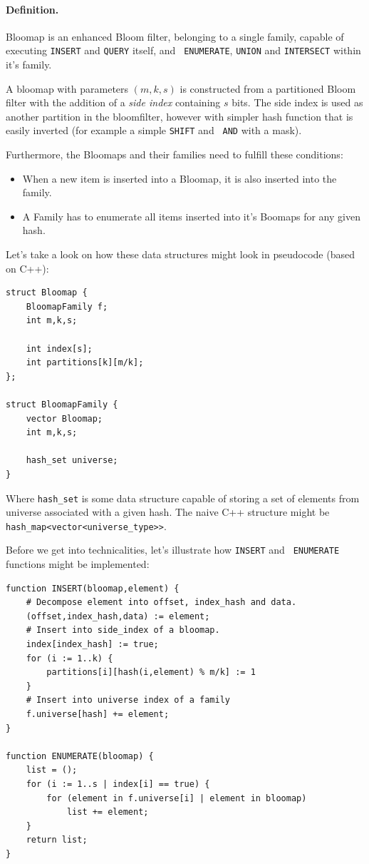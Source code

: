\paragraph{Definition.} Bloomap is an enhanced Bloom filter, belonging to a single
family, capable of executing {\tt INSERT} and {\tt QUERY} itself, and {\tt
ENUMERATE}, {\tt UNION} and {\tt INTERSECT} within it's family.

A bloomap with parameters $(m, k, s)$ is constructed from a partitioned Bloom
filter with the addition of a {\it side index} containing $s$ bits. The side
index is used as another partition in the bloomfilter, however with simpler hash
function that is easily inverted (for example a simple {\tt SHIFT} and {\tt
AND} with a mask).

Furthermore, the Bloomaps and their families need to fulfill these conditions:

\begin{itemize}
	\item When a new item is inserted into a Bloomap, it is also inserted into
		the family.
	\item A Family has to enumerate all items inserted into it's Boomaps for any
		given hash.
\end{itemize}

Let's take a look on how these data structures might look in pseudocode (based
on C++):


\begin{verbatim}
struct Bloomap {
    BloomapFamily f;
    int m,k,s;

    int index[s];
    int partitions[k][m/k];
};

struct BloomapFamily {
    vector Bloomap;
    int m,k,s;

    hash_set universe;
}
\end{verbatim}

Where {\tt hash\_set} is some data structure capable of storing a set of
elements from universe associated with a given hash. The naive C++ structure
might be {\tt hash\_map<vector<universe\_type>>}.

Before we get into technicalities, let's illustrate how {\tt INSERT} and {\tt
ENUMERATE} functions might be implemented:

\begin{verbatim}
function INSERT(bloomap,element) {
    # Decompose element into offset, index_hash and data.
    (offset,index_hash,data) := element;
    # Insert into side_index of a bloomap.
    index[index_hash] := true;
    for (i := 1..k) {
        partitions[i][hash(i,element) % m/k] := 1
    }
    # Insert into universe index of a family
    f.universe[hash] += element;
}

function ENUMERATE(bloomap) {
    list = ();
	for (i := 1..s | index[i] == true) {
        for (element in f.universe[i] | element in bloomap) 
            list += element;
    }
    return list;
}
\end{verbatim}

